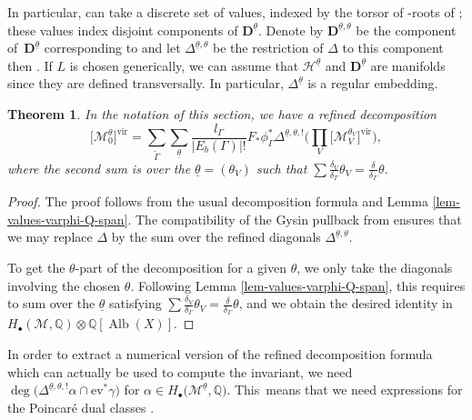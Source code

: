 \documentclass[pdftex]{sigma}
\newcommand{\vir}[1]{\big[#1\big]^\mathrm{vir}}
\newcommand{\ev}{\mathrm{ev}}
\newcommand{\Alb}{\operatorname{Alb}}
\newcommand{\QQ}{\mathbb{Q}}
\newcommand{\btheta}{ {\underline{\theta}} }
\newcommand{\bfD}{ {\boldsymbol D} }
\newcommand{\bfw}{ {\boldsymbol w} }
\newcommand{\M}{\mathcal{M}}
\renewcommand{\H}{\mathcal{H}}
\numberwithin{equation}{section}
\newtheorem{theo}{Theorem}[section]
\theoremstyle{definition}
\begin{document}
In particular, \smash{$a_{\bfw/\delta}\bigl(\bfD^\btheta\bigr)$} can take a discrete set of values, indexed by the torsor of \smash{$(\delta/\delta_\Gamma)$}-roots of ; these values index disjoint components of
$\bfD^\btheta$. Denote by $\bfD^{\btheta,\theta}$ be the component of~$\bfD^\btheta$ corresponding to \smash{$\theta \in a_{\bfw/\delta}\bigl(\bfD^\btheta\bigr)$} and let $\Delta^{\btheta,\theta}$ be the restriction of $\Delta$ to this component then
\smash{$\Delta^{\btheta} =\sum_{\theta}\Delta^{\btheta,\theta}$}.
If $L$ is chosen generically, we can assume that $\boldsymbol{\H}^\btheta$ and $\bfD^\btheta$ are manifolds since they are defined transversally.
In particular, $\Delta^{\btheta}$ is a regular embedding.

\begin{theo}\label{theo-refined-decomposition}
 In the notation of this section, we have a refined decomposition
 \[ \vir{\M_0^\theta} = \sum_{\widetilde{\Gamma}} \sum_{\btheta} \dfrac{l_{\Gamma}}{|E_b(\Gamma)|!} F_*\phi_{\Gamma}^*\Delta^{{\btheta,\theta},!}\biggl(\prod_V \vir{\M_V^{\theta_V}}\biggr), \]
 where the second sum is over the $\btheta=(\theta_V)$ such that
$\sum\frac{\delta_V}{\delta_\Gamma}\theta_V = \frac{\delta}{\delta_\Gamma}\theta$.
\end{theo}

\begin{proof}
The proof follows from the usual decomposition formula and Lemma \ref{lem-values-varphi-Q-span}. The compatibility of the Gysin pullback from \cite[Chapter~6]{fulton2013intersection} ensures that we may replace $\Delta$ by the sum over the refined diagonals $\Delta^{\btheta,\theta}$.

To get the $\theta$-part of the decomposition for a given $\theta$, we only take the diagonals involving the chosen $\theta$. Following Lemma \ref{lem-values-varphi-Q-span}, this requires to sum over the $\btheta$ satisfying $\sum\frac{\delta_V}{\delta_\Gamma}\theta_V=\frac{\delta}{\delta_\Gamma}\theta$, and we obtain the desired identity in $ H_\bullet(\M,\QQ)\otimes\QQ[\Alb(X)]$.
\end{proof}

In order to extract a numerical version of the refined decomposition formula which can actually be used to compute the invariant, we need
$\deg \bigl(\Delta^{\btheta,\theta,!}\alpha\cap \ev^*\gamma\bigr)$
for $\alpha\!\in\! H_\bullet\bigl(\M^{\btheta},\QQ\bigr)$. This~means that we need expressions for the Poincar\'e dual classes \smash{$\bigl(\bfD^{\btheta,\theta}\bigr)^{\vee}$}.
\end{document}
